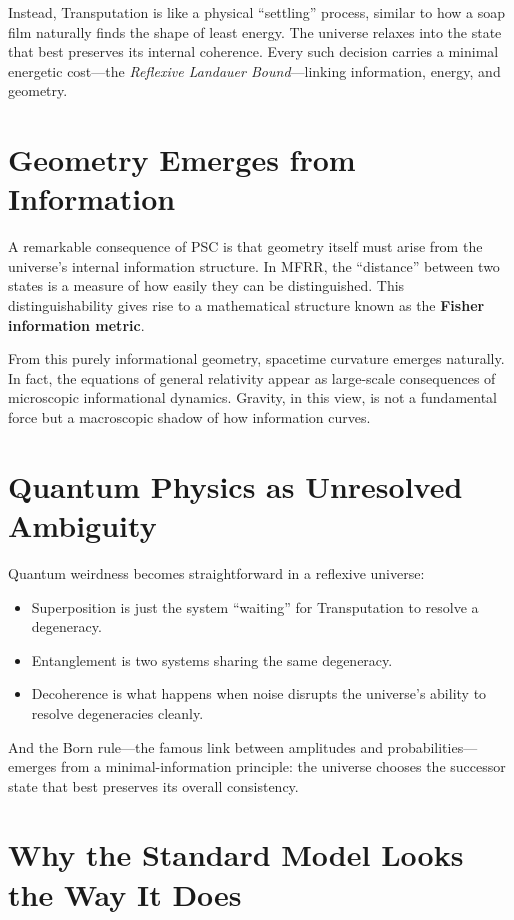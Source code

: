 \documentclass[11pt]{article}
\begin{document}
Instead, Transputation is like a physical ``settling'' process, similar to how a soap film naturally
finds the shape of least energy. The universe relaxes into the state that best preserves its
internal coherence. Every such decision carries a minimal energetic cost—the \emph{Reflexive
Landauer Bound}—linking information, energy, and geometry.

\section*{Geometry Emerges from Information}

A remarkable consequence of PSC is that geometry itself must arise from the universe’s internal
information structure. In MFRR, the ``distance'' between two states is a measure of how easily
they can be distinguished. This distinguishability gives rise to a mathematical structure known
as the \textbf{Fisher information metric}.

From this purely informational geometry, spacetime curvature emerges naturally. In fact, the
equations of general relativity appear as large-scale consequences of microscopic informational
dynamics. Gravity, in this view, is not a fundamental force but a macroscopic shadow of how
information curves.

\section*{Quantum Physics as Unresolved Ambiguity}

Quantum weirdness becomes straightforward in a reflexive universe:

\begin{itemize}
    \item Superposition is just the system ``waiting'' for Transputation to resolve a degeneracy.
    \item Entanglement is two systems sharing the same degeneracy.
    \item Decoherence is what happens when noise disrupts the universe’s ability to resolve
    degeneracies cleanly.
\end{itemize}

And the Born rule—the famous link between amplitudes and probabilities—emerges from a
minimal-information principle: the universe chooses the successor state that best preserves
its overall consistency.

\section*{Why the Standard Model Looks the Way It Does}
\end{document}
